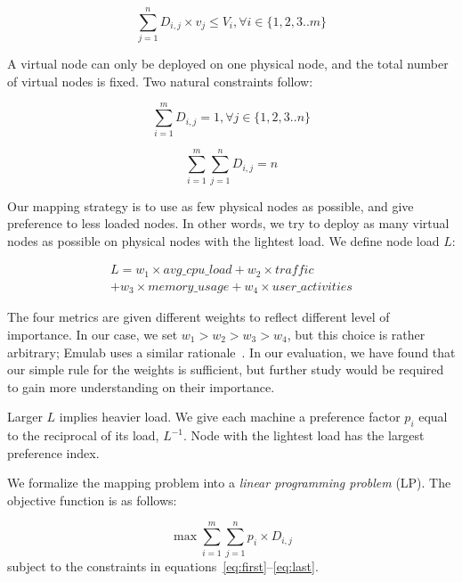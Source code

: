 \documentclass[conference]{IEEEtran}
\begin{document}
\begin{equation}
  \sum_{j=1}^{n} D_{i,j} \times v_j \le V_i, \forall i \in \{1, 2, 3 .. m\}
\end{equation}

A virtual node can only be deployed on one physical node, and the
total number of virtual nodes is fixed. Two natural constraints
follow:

\begin{equation}
  \sum_{i=1}^{m} D_{i,j} = 1, \forall j \in \{1, 2, 3 .. n\}
\end{equation}

\begin{equation}
  \label{eq:last}
  \sum_{i=1}^{m} \sum_{j=1}^{n} D_{i,j} = n
\end{equation}

Our mapping strategy is to use as few physical nodes as possible, and
give preference to less loaded nodes. In other words, we try to deploy
as many virtual nodes as possible on physical nodes with the lightest
load. We define node load $L$:

\begin{equation}
  \label{eq:lp:load}
  \begin{split}
    L = w_1 \times {avg\_cpu\_load} + w_2 \times traffic \\
    + w_3 \times memory\_usage + w_4 \times user\_activities
  \end{split}
\end{equation}

The four metrics are given different weights to reflect different
level of importance. In our case, we set $w_1 > w_2 > w_3 > w_4$, but
this choice is rather arbitrary; Emulab uses a similar
rationale~\cite{White:osdi02}. In our evaluation, we have found that
our simple rule for the weights is sufficient, but further study would
be required to gain more understanding on their importance.





Larger $L$ implies heavier load.  We give each machine a preference
factor $p_i$ equal to the reciprocal of its load, $L^{-1}$. Node with
the lightest load has the largest preference index.

We formalize the mapping problem into a \textit{linear programming
  problem} (LP). The objective function is as follows:

\begin{equation}
  \label{eq:lp:objective}
  \max \sum_{i=1}^{m} \sum_{j=1}^{n}{p_i \times D_{i,j}}
\end{equation}
subject to the constraints in
equations~\eqref{eq:first}--\eqref{eq:last}.
\end{document}
